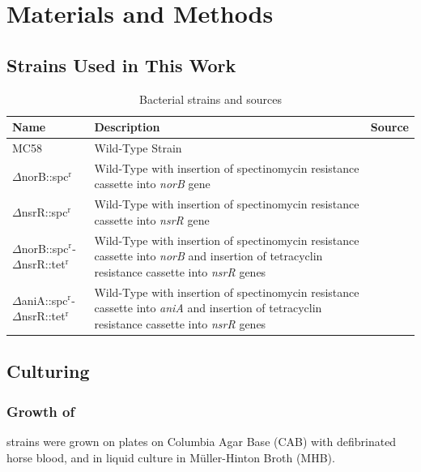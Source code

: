 \chapter{Materials and Methods}
\section{\Nsm{} Strains Used in This Work}
\begin{table}[h]
\begin{center}
\begin{tabular}{>{\centering}m{4.4cm}m{6.4cm}>{\centering}m{3.1cm}}
\toprule
\textbf{Name} & \centering \textbf{Description} & \textbf{Source}
\tabularnewline
\midrule
MC58 & Wild-Type Strain & \citet{McGuinness1990}
\tabularnewline\noalign{\smallskip}\hline\noalign{\smallskip}
$\Delta$norB::spc$^\textrm{r}$\nomenclature{spc$^\textrm{r}$}{Spectinomycin resistance} & Wild-Type with insertion of spectinomycin resistance cassette into \textit{norB} gene & \citet{Heurlier2008}
\tabularnewline\noalign{\smallskip}\hline\noalign{\smallskip}
$\Delta$nsrR::spc$^\textrm{r}$ & Wild-Type with insertion of spectinomycin resistance cassette into \textit{nsrR} gene & \citet{Rock2007}
\tabularnewline\noalign{\smallskip}\hline\noalign{\smallskip}
$\Delta$norB::spc$^\textrm{r}$-$\Delta$nsrR::tet$^\textrm{r}$\nomenclature{tet$^\textrm{r}$}{Tetracyclin resistance} & Wild-Type with insertion of spectinomycin resistance cassette into \textit{norB} and insertion of tetracyclin resistance cassette into \textit{nsrR} genes & \citet{Heurlier2008}
\tabularnewline\noalign{\smallskip}\hline\noalign{\smallskip}
$\Delta$aniA::spc$^\textrm{r}$-$\Delta$nsrR::tet$^\textrm{r}$ & Wild-Type with insertion of spectinomycin resistance cassette into \textit{aniA} and insertion of tetracyclin resistance cassette into \textit{nsrR} genes & \citet{Heurlier2008}
\tabularnewline
\bottomrule
\end{tabular} 
\end{center}
\caption{Bacterial strains and sources
\label{tab:bacterial-strains}}
\end{table}

\section{Culturing \Nsm{}}
\subsection{Growth of \Nsm{}}
\Nm{} strains were grown on plates on Columbia Agar Base (CAB) with defibrinated horse blood, and in liquid culture in M\"uller-Hinton Broth (MHB).

